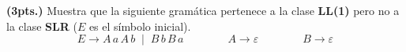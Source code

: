 
\textbf{(3pts.)} Muestra que la siguiente gram\'atica pertenece a la 
clase \textbf{LL(1)} pero no a la clase \textbf{SLR} ($E$ es el s\'imbolo inicial).
\[
E \to A \, a\, A\,b \;\mid\; B\,b\,B\,a \qquad \qquad  A \to \varepsilon 
\qquad\qquad B\to \varepsilon
\]
